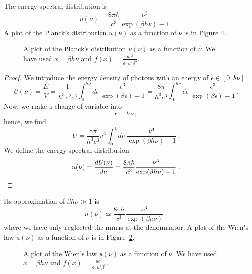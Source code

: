     The energy spectral distribution is 
    \begin{equation}
        u(\nu) = \frac{8 \pi h}{c^3} \frac{\nu^3}{\exp(\beta h \nu) - 1} ~.
    \end{equation}
    A plot of the Planck's distribution $u(\nu)$ as a function of $\nu$ is in Figure~\ref{br:p}.
    \begin{figure}
        \centering
        \caption{A plot of the Planck's distribution $u(\nu)$ as a function of $\nu$. We have used $x = \beta h \nu$ and $f(x) = \frac{u c^3}{8 \pi h^4 \beta^3}$.}
        \label{br:p}
    \end{figure}
    \begin{proof}
        We introduce the energy density of photons with an energy of $\epsilon \in [0, h\nu]$
        \begin{equation}
            U(\nu) = \frac{E}{V} = \frac{1}{\hbar^3 \pi^2 c^3} \int_0^{h \nu} d\epsilon ~ \frac{\epsilon^3}{\exp(\beta \epsilon) - 1} = \frac{8 \pi}{h^3 c^3} \int_0^{h\nu} d\epsilon ~ \frac{\epsilon^3}{\exp(\beta \epsilon) - 1} ~.
        \end{equation}
        Now, we make a change of variable into 
        \begin{equation}
            \epsilon = h \nu ~,
        \end{equation}
        hence, we find 
        \begin{equation*}
            U = \frac{8 \pi}{h^3 c^3} h^4 \int_0^{1} d\nu ~ \frac{\nu^3}{\exp(\beta h \nu) - 1} ~.
        \end{equation*}
        We define the energy spectral distribution 
        \begin{equation}
            u(\nu) = \frac{dU(\nu)}{d\nu} = \frac{8 \pi h}{c^3} \frac{\nu^3}{\exp(\beta h \nu) - 1} ~.
        \end{equation}
    \end{proof}

    Its approximation of $\beta h \nu \gg 1$ is 
    \begin{equation}
        u(\nu) \simeq \frac{8 \pi h}{c^3} \frac{\nu^3}{\exp(\beta h \nu)} ~,
    \end{equation}
    where we have only neglected the minus at the denominator. A plot of the Wien's law $u(\nu)$ as a function of $\nu$ is in Figure~\ref{br:w}.
    \begin{figure}
        \centering
        \caption{A plot of the Wien's law $u(\nu)$ as a function of $\nu$. We have used $x = \beta h \nu$ and $f(x) = \frac{u c^3}{8 \pi h^4 \beta^3}$.}
        \label{br:w}
    \end{figure}

